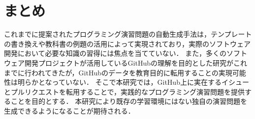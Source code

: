 \section{まとめ}
これまでに提案されたプログラミング演習問題の自動生成手法は，テンプレートの書き換えや教科書の例題の活用によって実現されており，実際のソフトウェア開発において必要な知識の習得には焦点を当てていない．
また，多くのソフトウェア開発プロジェクトが活用しているGitHubの理解を目的とした研究がこれまでに行われてきたが，GitHubのデータを教育目的に転用することの実現可能性は明らかとなっていない．
そこで本研究では，GitHub上に実在するイシューとプルリクエストを転用することで，実践的なプログラミング演習問題を提供することを目的とする．
本研究により既存の学習環境にはない独自の演習問題を生成できるようになることが期待される．
